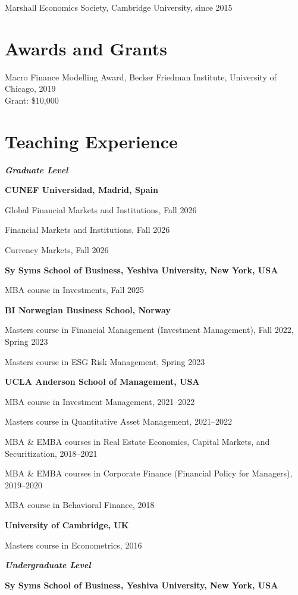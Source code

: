 \documentclass[11pt]{article}
\begin{document}
Marshall Economics Society, Cambridge University, since 2015

\section{Awards and Grants}
Macro Finance Modelling Award, Becker Friedman Institute, University of Chicago, 2019\\
\hspace*{1.5em}Grant: \$10,000

\section{Teaching Experience}
\textbf{\textit{Graduate Level}}

\smallskip
\textbf{CUNEF Universidad, Madrid, Spain}

Global Financial Markets and Institutions, Fall 2026

Financial Markets and Institutions, Fall 2026

Currency Markets, Fall 2026

\medskip
\textbf{Sy Syms School of Business, Yeshiva University, New York, USA}

MBA course in Investments, Fall 2025

\medskip
\textbf{BI Norwegian Business School, Norway}

Masters course in Financial Management (Investment Management), Fall 2022, Spring 2023

Masters course in ESG Risk Management, Spring 2023

\medskip
\textbf{UCLA Anderson School of Management, USA}

MBA course in Investment Management, 2021--2022

Masters course in Quantitative Asset Management, 2021--2022

MBA \& EMBA courses in Real Estate Economics, Capital Markets, and Securitization, 2018--2021

MBA \& EMBA courses in Corporate Finance (Financial Policy for Managers), 2019--2020

MBA course in Behavioral Finance, 2018

\medskip
\textbf{University of Cambridge, UK}

Masters course in Econometrics, 2016

\bigskip
\textbf{\textit{Undergraduate Level}}

\smallskip
\textbf{Sy Syms School of Business, Yeshiva University, New York, USA}
\end{document}

